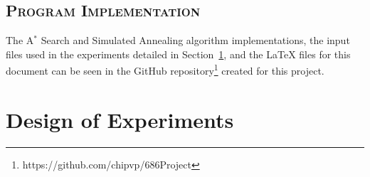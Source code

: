 \documentclass[conference]{IEEEtran}
\begin{document}
\subsection{\textsc{Program Implementation}} \label{sec:code}

The A$^*$ Search and Simulated Annealing algorithm implementations, the input
files used in the experiments detailed in Section~\ref{sec:experiment}, and the
{\LaTeX} files for this document can be seen in the GitHub
repository\footnote{https://github.com/chipvp/686Project} created for this
project.

\section{Design of Experiments} \label{sec:experiment}

 
\end{document}
